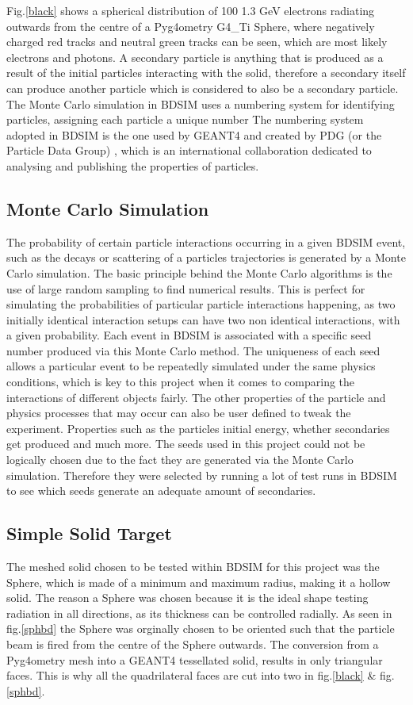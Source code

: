 \documentclass[12pt,a4paper]{article}
\begin{document}
\noindent Fig.\ref{black} shows a spherical distribution of 100 1.3 GeV electrons radiating outwards from the centre of a Pyg4ometry G4\_Ti Sphere, where negatively charged red tracks and neutral green tracks can be seen, which are most likely electrons and photons. A secondary particle is anything that is produced as a result of the initial particles interacting with the solid, therefore a secondary itself can produce another particle which is considered to also be  a secondary particle. The Monte Carlo simulation in BDSIM uses a numbering system for identifying particles, assigning each particle a unique number The numbering system adopted in BDSIM is the one used by GEANT4 and created by PDG (or the Particle Data Group) \cite{pdg}, which is an international collaboration dedicated to analysing and publishing the properties of particles. 

\subsection{Monte Carlo Simulation}
\label{monte}
\noindent The probability of certain particle interactions occurring in a given BDSIM event, such as the decays or scattering of a particles trajectories is generated by a Monte Carlo simulation. The basic principle behind the Monte Carlo algorithms is the use of large random sampling to find numerical results. This is perfect for simulating the probabilities of particular particle interactions happening, as two initially identical interaction setups can have two non identical interactions, with a given probability. Each event in BDSIM is associated with a specific seed number produced via this Monte Carlo method. The uniqueness of each seed allows a particular event to be repeatedly simulated under the same physics conditions, which is key to this project when it comes to comparing the interactions of different objects fairly. The other properties of the particle and physics processes that may occur can also be user defined to tweak the experiment. Properties such as the particles initial energy, whether secondaries get produced and much more. The seeds used in this project could not be logically chosen due to the fact they are generated via the Monte Carlo simulation. Therefore they were selected by running a lot of test runs in BDSIM to see which seeds generate an adequate amount of secondaries.

\subsection{Simple Solid Target}
The meshed solid chosen to be tested within BDSIM for this project was the Sphere, which is made of a minimum and maximum radius, making it a hollow solid. The reason a Sphere was chosen because it is the ideal shape testing radiation in all directions, as its thickness can be controlled radially. As seen in fig.\ref{sphbd} the Sphere was orginally chosen to be oriented such that the particle beam is fired from the centre of the Sphere outwards. The conversion from a Pyg4ometry mesh into a GEANT4 tessellated solid, results in only triangular faces. This is why all the quadrilateral faces are cut into two in fig.\ref{black} \& fig. \ref{sphbd}.
\end{document}
